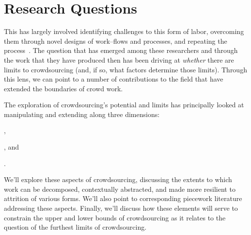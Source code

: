 \documentclass[trackingWork]{subfiles}
\begin{document}
\section{Research Questions}

This has largely involved
  identifying challenges to this form of labor,    overcoming them through novel designs of work--flows and processes, and
  repeating the process~\cite[e.g.][]{bernsteinSoylent,foundry,crowdForgeKittur}.
The question that has emerged
among these researchers and
through the work that they have produced then
has been driving at \textit{whether} there are limits to crowdsourcing
(and, if so, what factors determine those limits).
Through this lens, we can point to
a number of contributions to the field that have extended the boundaries of crowd work.

The exploration of crowdsourcing's potential and limits has principally looked at
manipulating and extending along three dimensions:
\begin{inlinelist}
  \item {},
  \item {}, and
  \item {}.
\end{inlinelist}
We'll explore these aspects of crowdsourcing,  discussing the extents to which work can be
decomposed,  contextually abstracted, and
made more resilient to attrition of various forms.
We'll also point to corresponding piecework literature addressing these aspects.
Finally, we'll discuss how these elements will serve
to constrain the upper and lower bounds of crowdsourcing as it relates
to the question of the furthest limits of crowdsourcing.






\end{document}
